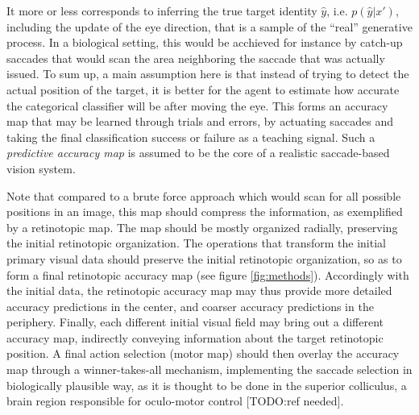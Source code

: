 It more or less corresponds to inferring the true target identity $\hat{y}$, i.e. $p(\hat{y}|x')$, including the update of the eye direction, that is a sample of the ``real'' generative process.
In a biological setting, this would be acchieved for instance by catch-up saccades that would scan the area neighboring the saccade that was actually issued. To sum up, a main assumption here is that instead of trying to detect the actual position of the target, it is better for the agent to estimate how accurate the categorical classifier will be after moving the eye. This forms an accuracy map that may be learned through trials and errors, by actuating saccades %
and taking the final classification success or failure as a teaching signal.
Such a \emph{predictive accuracy map} is assumed to be the core of a realistic saccade-based vision system.

Note that compared to a brute force approach which would scan for all possible positions in an image, this map should compress the information, as exemplified by a retinotopic map. The map should be mostly organized radially, preserving the initial retinotopic organization. %
The operations that transform the initial primary visual data should preserve the initial retinotopic organization, so as to form a final retinotopic accuracy map (see figure \ref{fig:methods}). Accordingly with the initial data, the retinotopic accuracy map may thus provide more detailed accuracy predictions in the center, and coarser accuracy predictions in the periphery.
Finally, each different initial visual field may bring out a different accuracy map, indirectly conveying information about the target retinotopic position.
A final action selection (motor map) should then overlay the accuracy map through a winner-takes-all mechanism, implementing the saccade selection in biologically plausible way, as it is thought to be done in the superior colliculus, a brain region responsible for oculo-motor control [TODO:ref needed].

